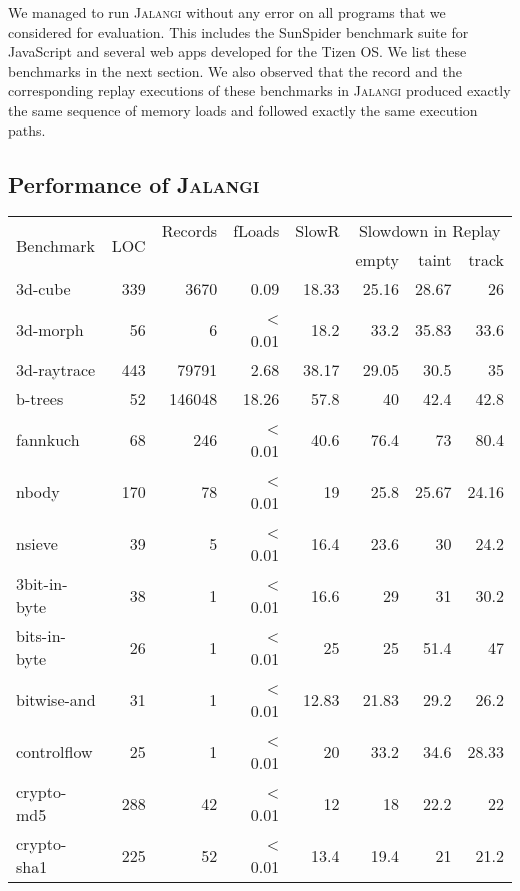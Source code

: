 \documentclass{sig-alternate}
\def\jalangi{\textsc{Jalangi}}
\begin{document}
We managed to run \jalangi{} without any error on all programs that we
considered for evaluation.  This includes the SunSpider benchmark
suite for JavaScript and several web apps developed for the Tizen OS.
We list these benchmarks in the next section.  We also observed that
the record and the corresponding replay executions of these benchmarks
in \jalangi{} produced exactly the same sequence of memory loads and
followed exactly the same execution paths.

\subsection{Performance of  \jalangi{}}
\label{sec:performance-jalangi}

\begin{table*}
\begin{minipage}{0.6\textwidth}
{\scriptsize
\begin{center}
\begin{tabular}{|l|r|r|r|r|r|r|r|} \hline
\multirow{2}{*}{Benchmark} & \multirow{2}{*}{LOC} & \scriptsize{Records} & \scriptsize{fLoads}& \scriptsize{SlowR} &
\multicolumn{3}{|c|}{\scriptsize{ Slowdown in Replay}}\\
& & & & & empty & taint & track \\
\hline
3d-cube & 339 & 3670 & 0.09 & 18.33  & 25.16 & 28.67 & 26 \\
3d-morph& 56 & 6 & < 0.01 & 18.2 & 33.2 & 35.83 & 33.6 \\
3d-raytrace& 443 & 79791 & 2.68 & 38.17 & 29.05 & 30.5 & 35\\
b-trees& 52 & 146048 & 18.26 & 57.8 & 40 & 42.4 & 42.8\\
fannkuch& 68 & 246 & < 0.01 & 40.6 & 76.4 & 73 & 80.4 \\
nbody& 170 & 78 & < 0.01 & 19 & 25.8& 25.67 & 24.16\\
nsieve& 39 & 5 & < 0.01 & 16.4 & 23.6 & 30 & 24.2\\
3bit-in-byte& 38 & 1 & < 0.01& 16.6& 29 & 31 & 30.2 \\
bits-in-byte& 26 & 1 & < 0.01& 25 & 25 & 51.4 & 47 \\
bitwise-and& 31 & 1 & < 0.01& 12.83 & 21.83 & 29.2 & 26.2\\
controlflow& 25 & 1 & < 0.01& 20 & 33.2 & 34.6 & 28.33\\
crypto-md5& 288 & 42 & < 0.01& 12 & 18 & 22.2 & 22\\
crypto-sha1& 225 & 52 & < 0.01& 13.4& 19.4 & 21 & 21.2\\

\end{tabular}
\end{center}}
\end{minipage}
\end{table*}
\end{document}
